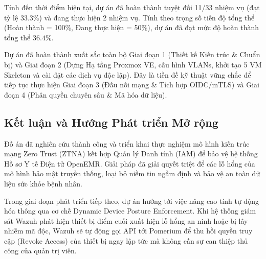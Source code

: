 Tính đến thời điểm hiện tại, dự án đã hoàn thành tuyệt đối 11/33 nhiệm vụ (đạt tỷ lệ 33.3\%) và đang thực hiện 2 nhiệm vụ. Tính theo trọng số tiến độ tổng thể (Hoàn thành = 100\%, Đang thực hiện = 50\%), dự án đã đạt mức độ hoàn thành tổng thể $\mathbf{36.4\%}$.

Dự án đã hoàn thành xuất sắc toàn bộ Giai đoạn 1 (Thiết kế Kiến trúc \& Chuẩn bị) và Giai đoạn 2 (Dựng Hạ tầng Proxmox VE, cấu hình VLANs, khởi tạo 5 VM Skeleton và cài đặt các dịch vụ độc lập). Đây là tiền đề kỹ thuật vững chắc để tiếp tục thực hiện Giai đoạn 3 (Đấu nối mạng \& Tích hợp OIDC/mTLS) và Giai đoạn 4 (Phân quyền chuyên sâu \& Mã hóa dữ liệu).

\subsection{Kết luận và Hướng Phát triển Mở rộng}

Đồ án đã nghiên cứu thành công và triển khai thực nghiệm mô hình kiến trúc mạng Zero Trust (ZTNA) kết hợp Quản lý Danh tính (IAM) để bảo vệ hệ thống Hồ sơ Y tế Điện tử OpenEMR. Giải pháp đã giải quyết triệt để các lỗ hổng của mô hình bảo mật truyền thống, loại bỏ niềm tin ngầm định và bảo vệ an toàn dữ liệu sức khỏe bệnh nhân.

Trong giai đoạn phát triển tiếp theo, dự án hướng tới việc nâng cao tính tự động hóa thông qua cơ chế Dynamic Device Posture Enforcement. Khi hệ thống giám sát Wazuh phát hiện thiết bị điểm cuối xuất hiện lỗ hổng an ninh hoặc bị lây nhiễm mã độc, Wazuh sẽ tự động gọi API tới Pomerium để thu hồi quyền truy cập (Revoke Access) của thiết bị ngay lập tức mà không cần sự can thiệp thủ công của quản trị viên.
